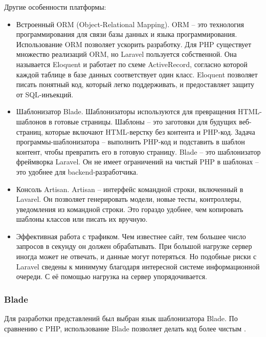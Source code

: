 Другие особенности платформы:
\begin{itemize}
	\item Встроенный ORM (Object-Relational Mapping). ORM -- это технология программирования для связи базы данных и языка программирования. Использование ORM позволяет ускорить разработку. Для PHP существует множество реализаций ORM, но Laravel пользуется собственной. Она называется Eloquent и работает по схеме ActiveRecord, согласно которой каждой таблице в базе данных соответствует один класс. Eloquent позволяет писать понятный код, который легко поддерживать, и предоставляет защиту от SQL-инъекций.
	\item Шаблонизатор Blade. Шаблонизаторы используются для превращения HTML-шаблонов в готовые страницы. Шаблоны -- это заготовки для будущих веб-страниц, которые включают HTML-верстку без контента и PHP-код. Задача программы-шаблонизатора -- выполнить PHP-код и подставить в шаблон контент, чтобы превратить его в готовую страницу. Blade -- это шаблонизатор фреймворка Laravel. Он не имеет ограничений на чистый PHP в шаблонах -- это удобнее для backend-разработчика.
	\item Консоль Artisan. Artisan -- интерфейс командной строки, включенный в Lavarel. Он позволяет генерировать модели, новые тесты, контроллеры, уведомления из командной строки. Это гораздо удобнее, чем копировать шаблоны классов или писать их вручную.
	\item Эффективная работа с трафиком. Чем известнее сайт, тем большее число запросов в секунду он должен обрабатывать. При большой нагрузке сервер иногда может не отвечать, и данные могут потеряться. Но подобные риски с Laravel сведены к минимуму благодаря интересной системе информационной очереди. С её помощью нагрузка на сервер упорядочивается.
\end{itemize}

\subsubsection{Blade}

Для разработки представлений был выбран язык шаблонизатора Blade. По сравнению с PHP, использование Blade позволяет делать код более чистым \cite{kirichenko}.

